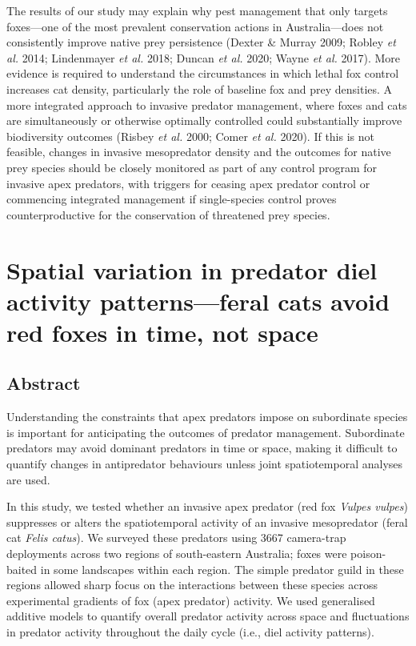 \documentclass[11pt,a4paper,titlepage,twoside,openright]{style/unimelbthesis}
\begin{document}
\begin{mainmatter}
The results of our study may explain why pest management that only targets foxes---one of the most prevalent conservation actions in Australia---does not consistently improve native prey persistence (Dexter \& Murray 2009; Robley \emph{et al.} 2014; Lindenmayer \emph{et al.} 2018; Duncan \emph{et al.} 2020; Wayne \emph{et al.} 2017). More evidence is required to understand the circumstances in which lethal fox control increases cat density, particularly the role of baseline fox and prey densities. A more integrated approach to invasive predator management, where foxes and cats are simultaneously or otherwise optimally controlled could substantially improve biodiversity outcomes (Risbey \emph{et al.} 2000; Comer \emph{et al.} 2020). If this is not feasible, changes in invasive mesopredator density and the outcomes for native prey species should be closely monitored as part of any control program for invasive apex predators, with triggers for ceasing apex predator control or commencing integrated management if single-species control proves counterproductive for the conservation of threatened prey species.

\hypertarget{diel}{%
\chapter{Spatial variation in predator diel activity patterns---feral cats avoid red foxes in time, not space}\label{diel}}

\hypertarget{abstract-3}{%
\section*{Abstract}\label{abstract-3}}

Understanding the constraints that apex predators impose on subordinate species is important for anticipating the outcomes of predator management. Subordinate predators may avoid dominant predators in time or space, making it difficult to quantify changes in antipredator behaviours unless joint spatiotemporal analyses are used.

In this study, we tested whether an invasive apex predator (red fox \emph{Vulpes vulpes}) suppresses or alters the spatiotemporal activity of an invasive mesopredator (feral cat \emph{Felis catus}). We surveyed these predators using 3667 camera-trap deployments across two regions of south-eastern Australia; foxes were poison-baited in some landscapes within each region. The simple predator guild in these regions allowed sharp focus on the interactions between these species across experimental gradients of fox (apex predator) activity. We used generalised additive models to quantify overall predator activity across space and fluctuations in predator activity throughout the daily cycle (i.e., diel activity patterns).


\end{mainmatter}
\end{document}
